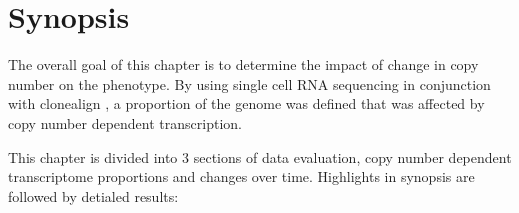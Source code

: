


 \section{Synopsis}

The overall goal of this chapter is to determine the impact of change in copy number on the phenotype. By using single cell RNA sequencing in conjunction with clonealign  \cite{campbell2019clonealign}, a proportion of the genome  was defined that was affected by copy number dependent transcription.
 
 This chapter is divided into 3 sections of data evaluation, copy number dependent transcriptome proportions and changes over time. Highlights in synopsis are followed by detialed results: 
  
